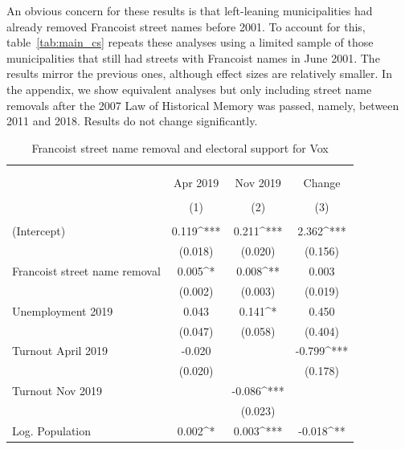 \documentclass[12pt, notitlepage]{article}
\begin{document}
An obvious concern for these results is that left-leaning municipalities had already removed Francoist street names before 2001.
To account for this, table~\ref{tab:main_cs} repeats these analyses using a limited sample of those municipalities that still had streets with Francoist names in June 2001.
The results mirror the previous ones, although effect sizes are relatively smaller.
In the appendix, we show equivalent analyses but only including street name removals after the 2007 Law of Historical Memory was passed, namely, between 2011 and 2018.
Results do not change significantly.

\begin{table}[!htbp] \centering
  \caption{Francoist street name removal and electoral support for Vox}
  \label{tab:cs_limited}
\small
\begin{tabular}{lccc}
\\[-1.8ex]\hline
\hline \\[-1.8ex]
\\[-1.8ex] & \multicolumn{1}{c}{\footnotesize Apr 2019} & \multicolumn{1}{c}{\footnotesize Nov 2019} & \multicolumn{1}{c}{\footnotesize Change} \\
\\[-1.8ex] & \multicolumn{1}{c}{(1)} & \multicolumn{1}{c}{(2)} & \multicolumn{1}{c}{(3)}\\
\hline \\[-1.8ex]
 (Intercept) & 0.119^{***} & 0.211^{***} & 2.362^{***} \\
  & (0.018) & (0.020) & (0.156) \\
  Francoist street name removal & 0.005^{*} & 0.008^{**} & 0.003 \\
  & (0.002) & (0.003) & (0.019) \\
  Unemployment 2019 & 0.043 & 0.141^{*} & 0.450 \\
  & (0.047) & (0.058) & (0.404) \\
  Turnout April 2019 & -0.020 &  & -0.799^{***} \\
  & (0.020) &  & (0.178) \\
  Turnout Nov 2019 &  & -0.086^{***} &  \\
  &  & (0.023) &  \\
  Log. Population & 0.002^{*} & 0.003^{***} & -0.018^{**} \\

\end{tabular}
\end{table}
\end{document}
